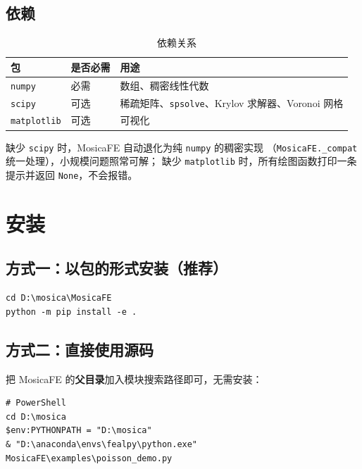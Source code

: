 \documentclass[UTF8,11pt,oneside]{ctexbook}
\theoremstyle{definition}
\theoremstyle{plain}
\newcommand{\mosica}{\textsf{MosicaFE}}
\newcommand{\code}[1]{\texttt{#1}}
\newcommand{\module}[1]{\texttt{MosicaFE.#1}}
\begin{document}
\subsection{依赖}

\begin{table}[htbp]
\centering
\caption{依赖关系}
\label{tab:deps}
\begin{lrbox}{\guideTableBox}
\begin{tabular}{@{}lll@{}}
\toprule
包 & 是否必需 & 用途 \\
\midrule
\code{numpy} & 必需 & 数组、稠密线性代数 \\
\code{scipy} & 可选 & 稀疏矩阵、\code{spsolve}、Krylov 求解器、Voronoi 网格 \\
\code{matplotlib} & 可选 & 可视化 \\
\bottomrule
\end{tabular}
\end{lrbox}%
\ifdim\wd\guideTableBox>\linewidth
  \resizebox{\linewidth}{!}{\usebox{\guideTableBox}}%
\else\usebox{\guideTableBox}\fi
\end{table}

缺少 \code{scipy} 时，\mosica{} 自动退化为纯 \code{numpy} 的稠密实现
（\module{\_compat} 统一处理），小规模问题照常可解；
缺少 \code{matplotlib} 时，所有绘图函数打印一条提示并返回 \code{None}，不会报错。

\section{安装}

\subsection{方式一：以包的形式安装（推荐）}

\begin{lstlisting}[style=shell]
cd D:\mosica\MosicaFE
python -m pip install -e .
\end{lstlisting}

\subsection{方式二：直接使用源码}

把 \mosica{} 的\textbf{父目录}加入模块搜索路径即可，无需安装：

\begin{lstlisting}[style=shell]
# PowerShell
cd D:\mosica
$env:PYTHONPATH = "D:\mosica"
& "D:\anaconda\envs\fealpy\python.exe" MosicaFE\examples\poisson_demo.py
\end{lstlisting}
\end{document}
